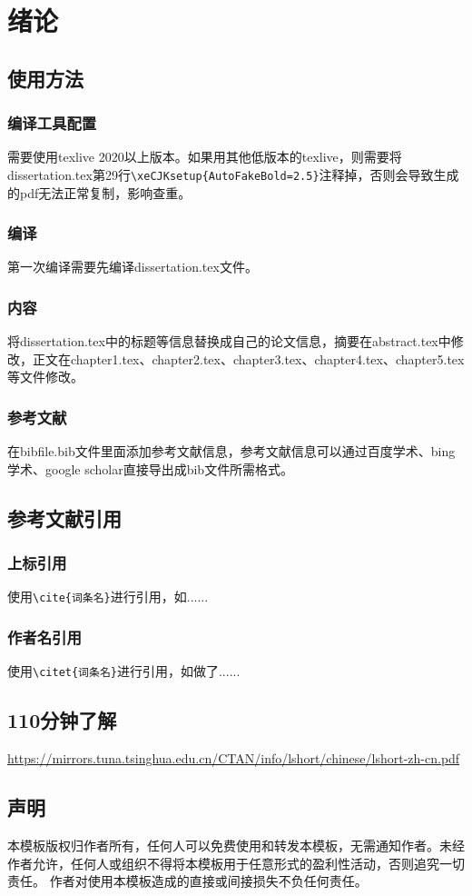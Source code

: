 \chapter{绪论}
\section{使用方法}
\subsection{编译工具配置}
需要使用texlive 2020以上版本。如果用其他低版本的texlive，则需要将dissertation.tex第29行\verb|\xeCJKsetup{AutoFakeBold=2.5}|注释掉，否则会导致生成的pdf无法正常复制，影响查重。

\subsection{编译}
第一次编译需要先编译dissertation.tex文件。

\subsection{内容}
将dissertation.tex中的标题等信息替换成自己的论文信息，摘要在abstract.tex中修改，正文在chapter1.tex、chapter2.tex、chapter3.tex、chapter4.tex、chapter5.tex等文件修改。

\subsection{参考文献}
在bibfile.bib文件里面添加参考文献信息，参考文献信息可以通过百度学术、bing学术、google scholar直接导出成bib文件所需格式。

\section{参考文献引用}
\subsection{上标引用}
使用\verb|\cite{词条名}|进行引用，如\cite{hofmann2006physical}......

\subsection{作者名引用}
使用\verb|\citet{词条名}|进行引用，如\citet{blakely1996potential}做了......

\section{110分钟了解\LaTeXe}
\href{https://mirrors.tuna.tsinghua.edu.cn/CTAN/info/lshort/chinese/lshort-zh-cn.pdf}{https://mirrors.tuna.tsinghua.edu.cn/CTAN/info/lshort/chinese/lshort-zh-cn.pdf}

\section{声明}
本模板版权归作者所有，任何人可以免费使用和转发本模板，无需通知作者。未经作者允许，任何人或组织不得将本模板用于任意形式的盈利性活动，否则追究一切责任。
作者对使用本模板造成的直接或间接损失不负任何责任。
